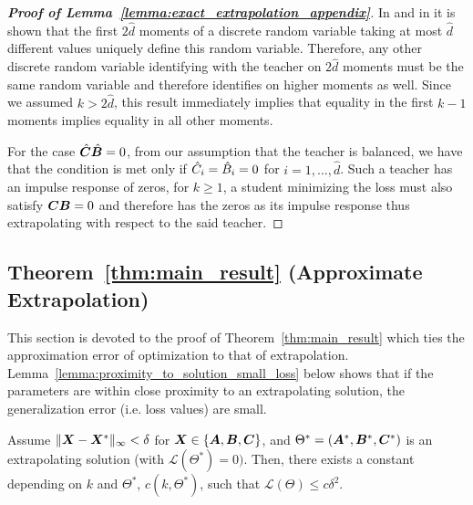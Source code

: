 \begin{proof}[\textbf{Proof of Lemma~\ref{lemma:exact_extrapolation_appendix}}]
 In \cite[Theorem 1]{cohen2011use}  and in \cite[Lemma 4]{wu2020optimal} it is shown that the first $2\hat{d}$ moments of a discrete random variable taking at most $\hat{d}$ different values uniquely define this random variable. Therefore, any other discrete random variable identifying with the teacher on $2\hat{d}$ moments must be the same random variable and therefore identifies on higher moments as well. Since we assumed $k > 2\hat{d}$, this result immediately implies that equality in the first $k-1$ moments implies equality in all other moments.

 For the case $\hat{{\bm{C}}}\hat{{\bm{B}}}=0$, from our assumption that the teacher is balanced, we have that the condition is met only if $\hat{{C}}_i=\hat{{B}}_i=0$ for $i=1,\dots,\hat{d}$. Such a teacher has an impulse response of zeros, for $k\ge 1$, a student minimizing the loss must also satisfy ${\bm{C}}{\bm{B}}=0$ and therefore has the zeros as its impulse response thus extrapolating with respect to the said teacher.

\end{proof}


\subsection{Theorem~\ref{thm:main_result} (Approximate Extrapolation)}\label{sec:apdx:approx_extrapolation}
This section is devoted to the proof of Theorem~\ref{thm:main_result} which ties the approximation error of optimization to that of extrapolation. Lemma~\ref{lemma:proximity_to_solution_small_loss} below shows that if the parameters are within close proximity to an extrapolating solution, the generalization error (i.e. loss values) are small. 

\begin{lemma}\label{lemma:proximity_to_solution_small_loss}
    Assume $\| {\bm{X}} - {\bm{X}}^*\|_\infty < \delta$ for ${\bm{X}}\in\{{\bm{A}},{\bm{B}},{\bm{C}}\}$, and $\Theta^*=({\bm{A}}^*,{\bm{B}}^*,{\bm{C}}^*)$ is an extrapolating solution (with $\mathcal{L}(\Theta^*)=0)$. Then, there exists a constant depending on $k$ and $\Theta^*$, $c(k, \Theta^*)$, such that $\mathcal{L}(\Theta)\le c \delta^2$.
\end{lemma}

